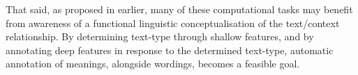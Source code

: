 That said, as proposed in earlier, many of these computational tasks may benefit from awareness of a functional linguistic conceptualisation of the text\slash context relationship. By determining text-type through shallow features, and by annotating deep features in response to the determined text-type, automatic annotation of meanings, alongside wordings, becomes a feasible goal.





